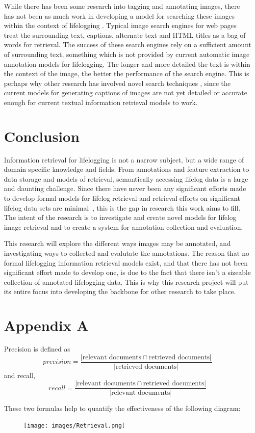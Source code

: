 \documentclass[12pt,a4paper]{article}
\begin{document}
While there has been some research into tagging and annotating images, there has not been as much work in developing a model for searching these images within the context of lifelogging \citep{gurrin2014lifelogging}. Typical image search engines for web pages treat the surrounding text, captions, alternate text and HTML titles \citep{frankel1996webseer} as a bag of words for retrieval. The success of these search engines rely on a sufficient amount of surrounding text, something which is not provided by current automatic image annotation models for lifelogging. The longer and more detailed the text is within the context of the image, the better the performance of the search engine. This is perhaps why other research has involved novel search techniques \citep{vuurpij2002vind}, since the current models for generating captions of images are not yet detailed or accurate enough for current textual information retrieval models to work.

\section{Conclusion}

Information retrieval for lifelogging is not a narrow subject, but a wide range of domain specific knowledge and fields. From annotations and feature extraction to data storage and models of retrieval, semantically accessing lifelog data is a large and daunting challenge. Since there have never been any significant efforts made to develop formal models for lifelog retrieval and retrieval efforts on significant lifelog data sets are minimal~\cite{gurrin2014lifelogging}, this is the gap in research this work aims to fill. The intent of the research is to investigate and create novel models for lifelog image retrieval and to create a system for annotation collection and evaluation.

This research will explore the different ways images may be annotated, and investigating ways to collected and evalutate the annotations. The reason that no formal lifelogging information retrieval models exist, and that there has not been significant effort made to develop one, is due to the fact that there isn't a sizeable collection of annotated lifelogging data. This is why this research project will put its entire focus into developing the backbone for other research to take place.

%



\section{Appendix A}
Precision is defined as 
\begin{equation}
precision = \frac{| \text{relevant documents}\cap\text{retrieved documents}|}{|\text{retrieved documents}|}
\end{equation} and recall,
\begin{equation}
recall = \frac{| \text{relevant documents}\cap\text{retrieved documents}|}{|\text{relevant documents}|}
\end{equation}

These two formulas help to quantify the effectiveness of the following diagram:
\begin{figure}[H]
    \centering
    \texttt{[image: images/Retrieval.png]}
\end{figure}
\end{document}
